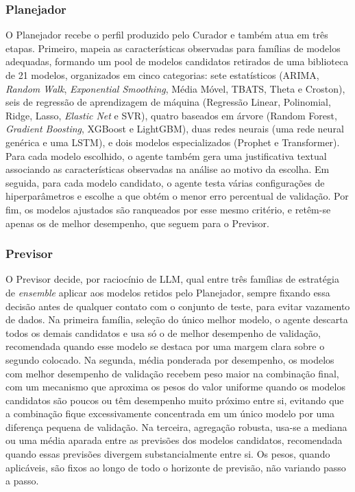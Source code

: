 \subsubsection{Planejador}

O Planejador recebe o perfil produzido pelo Curador e também atua em três etapas. Primeiro, mapeia as características observadas para famílias de modelos adequadas, formando um pool de modelos candidatos retirados de uma biblioteca de 21 modelos, organizados em cinco categorias: sete estatísticos (ARIMA, \textit{Random Walk}, \textit{Exponential Smoothing}, Média Móvel, TBATS, Theta e Croston), seis de regressão de aprendizagem de máquina (Regressão Linear, Polinomial, Ridge, Lasso, \textit{Elastic Net} e SVR), quatro baseados em árvore (Random Forest, \textit{Gradient Boosting}, XGBoost e LightGBM), duas redes neurais (uma rede neural genérica e uma LSTM), e dois modelos especializados (Prophet e Transformer). Para cada modelo escolhido, o agente também gera uma justificativa textual associando as características observadas na análise ao motivo da escolha. Em seguida, para cada modelo candidato, o agente testa várias configurações de hiperparâmetros e escolhe a que obtém o menor erro percentual de validação. Por fim, os modelos ajustados são ranqueados por esse mesmo critério, e retêm-se apenas os de melhor desempenho, que seguem para o Previsor.

\subsubsection{Previsor}

O Previsor decide, por raciocínio de LLM, qual entre três famílias de estratégia de \textit{ensemble} aplicar aos modelos retidos pelo Planejador, sempre fixando essa decisão antes de qualquer contato com o conjunto de teste, para evitar vazamento de dados. Na primeira família, seleção do único melhor modelo, o agente descarta todos os demais candidatos e usa só o de melhor desempenho de validação, recomendada quando esse modelo se destaca por uma margem clara sobre o segundo colocado. Na segunda, média ponderada por desempenho, os modelos com melhor desempenho de validação recebem peso maior na combinação final, com um mecanismo que aproxima os pesos do valor uniforme quando os modelos candidatos são poucos ou têm desempenho muito próximo entre si, evitando que a combinação fique excessivamente concentrada em um único modelo por uma diferença pequena de validação. Na terceira, agregação robusta, usa-se a mediana ou uma média aparada entre as previsões dos modelos candidatos, recomendada quando essas previsões divergem substancialmente entre si. Os pesos, quando aplicáveis, são fixos ao longo de todo o horizonte de previsão, não variando passo a passo.


